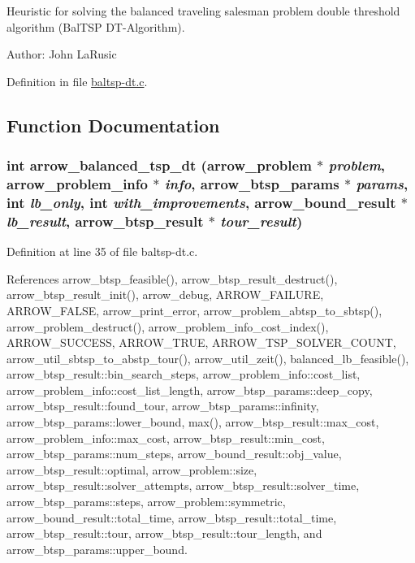 Heuristic for solving the balanced traveling salesman problem double threshold algorithm (BalTSP DT-Algorithm).

\begin{Desc}
\item[Author:]John LaRusic \end{Desc}


Definition in file \hyperlink{lib_2baltsp_2baltsp-dt_8c-source}{baltsp-dt.c}.

\subsection{Function Documentation}
\hypertarget{lib_2baltsp_2baltsp-dt_8c_abd717f64120ef3834dcdc1c8c98e336}{
\subsubsection[{arrow\_\-balanced\_\-tsp\_\-dt}]{\setlength{\rightskip}{0pt plus 5cm}int arrow\_\-balanced\_\-tsp\_\-dt ({\bf arrow\_\-problem} $\ast$ {\em problem}, \/  {\bf arrow\_\-problem\_\-info} $\ast$ {\em info}, \/  {\bf arrow\_\-btsp\_\-params} $\ast$ {\em params}, \/  int {\em lb\_\-only}, \/  int {\em with\_\-improvements}, \/  {\bf arrow\_\-bound\_\-result} $\ast$ {\em lb\_\-result}, \/  {\bf arrow\_\-btsp\_\-result} $\ast$ {\em tour\_\-result})}}
\label{lib_2baltsp_2baltsp-dt_8c_abd717f64120ef3834dcdc1c8c98e336}




Definition at line 35 of file baltsp-dt.c.

References arrow\_\-btsp\_\-feasible(), arrow\_\-btsp\_\-result\_\-destruct(), arrow\_\-btsp\_\-result\_\-init(), arrow\_\-debug, ARROW\_\-FAILURE, ARROW\_\-FALSE, arrow\_\-print\_\-error, arrow\_\-problem\_\-abtsp\_\-to\_\-sbtsp(), arrow\_\-problem\_\-destruct(), arrow\_\-problem\_\-info\_\-cost\_\-index(), ARROW\_\-SUCCESS, ARROW\_\-TRUE, ARROW\_\-TSP\_\-SOLVER\_\-COUNT, arrow\_\-util\_\-sbtsp\_\-to\_\-abstp\_\-tour(), arrow\_\-util\_\-zeit(), balanced\_\-lb\_\-feasible(), arrow\_\-btsp\_\-result::bin\_\-search\_\-steps, arrow\_\-problem\_\-info::cost\_\-list, arrow\_\-problem\_\-info::cost\_\-list\_\-length, arrow\_\-btsp\_\-params::deep\_\-copy, arrow\_\-btsp\_\-result::found\_\-tour, arrow\_\-btsp\_\-params::infinity, arrow\_\-btsp\_\-params::lower\_\-bound, max(), arrow\_\-btsp\_\-result::max\_\-cost, arrow\_\-problem\_\-info::max\_\-cost, arrow\_\-btsp\_\-result::min\_\-cost, arrow\_\-btsp\_\-params::num\_\-steps, arrow\_\-bound\_\-result::obj\_\-value, arrow\_\-btsp\_\-result::optimal, arrow\_\-problem::size, arrow\_\-btsp\_\-result::solver\_\-attempts, arrow\_\-btsp\_\-result::solver\_\-time, arrow\_\-btsp\_\-params::steps, arrow\_\-problem::symmetric, arrow\_\-bound\_\-result::total\_\-time, arrow\_\-btsp\_\-result::total\_\-time, arrow\_\-btsp\_\-result::tour, arrow\_\-btsp\_\-result::tour\_\-length, and arrow\_\-btsp\_\-params::upper\_\-bound.

